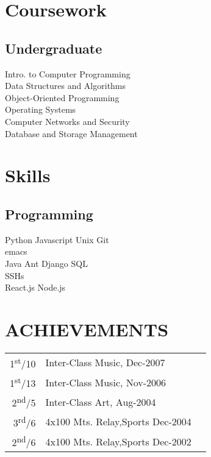 \documentclass[hidelinks]{deedy-resume-openfont}
\renewcommand{\sectionsep}[0]{\vspace{8pt}}
\begin{document}
\begin{minipage}[t]{0.33\textwidth}

\section{Coursework}
\subsection{Undergraduate}
Intro. to Computer Programming\\
Data Structures and Algorithms\\ 
Object-Oriented Programming\\
Operating Systems\\
Computer Networks and  Security\\
Database and Storage Management
\sectionsep


\section{Skills}
\subsection{Programming}
Python \textbullet{} Javascript \textbullet{} Unix  \textbullet{} Git \\
emacs \\
Java \textbullet{}  Ant \textbullet{} Django \textbullet{} SQL \\ SSHs \\
React.js \textbullet{} Node.js
\sectionsep


\section{ACHIEVEMENTS}
\begin{tabular}{rll}
1\textsuperscript{st}/10 & Inter-Class Music, Dec-2007\\
1\textsuperscript{st}/13 & Inter-Class Music, Nov-2006\\
2\textsuperscript{nd}/5 & Inter-Class Art, Aug-2004\\
3\textsuperscript{rd}/6 & 4x100 Mts. Relay,Sports Dec-2004 \\
2\textsuperscript{nd}/6 & 4x100 Mts. Relay,Sports Dec-2002
\end{tabular}
\sectionsep


\end{minipage}
\end{document}
